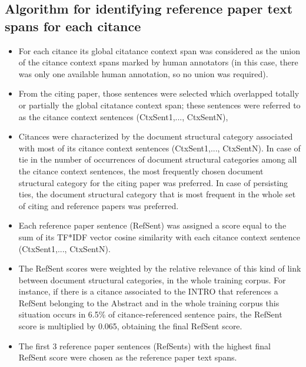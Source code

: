 \documentclass[11pt]{article}
\begin{document}
\subsection{ Algorithm for identifying reference paper text spans 
				for each citance}
\begin{itemize}
\item{For each citance its global citatance context span was considered as the union 
of the citance context spans} marked by human annotators (in this case, there 
was only one available human annotation, so no union was required).
\item{From the citing paper, those sentences were selected} which overlapped totally 
or partially the global citatance context span; these sentences were referred 
to as the citance context sentences (CtxSent1,..., CtxSentN),
\item{Citances were characterized by the document structural category 
associated with most of its citance context sentences 
(CtxSent1,..., CtxSentN)}. In case of tie in the number of occurrences of 
document structural categories among all the citance context sentences, the most frequently chosen document structural category for the citing paper was preferred. In case of persisting ties, the document structural category that is most frequent in the whole set of citing and reference papers was preferred.
\item{Each reference paper sentence (RefSent) was assigned a score} equal 
to the sum of its TF*IDF vector cosine similarity with each citance context 
sentence (CtxSent1,..., CtxSentN).
\item{The RefSent scores were weighted by the relative relevance} of this kind of link between document structural 
categories,  in the whole training corpus. For instance, if there is a citance associated to the 
INTRO that references a RefSent belonging to the Abstract and in the whole training corpus this situation occurs in 6.5\% of citance-referenced sentence pairs, the RefSent score is multiplied by 0.065, obtaining the final 
RefSent score.
\item{The first 3 reference paper sentences} (RefSents) with the highest 
final RefSent score were chosen as the reference paper text spans.
\end{itemize}
\end{document}
